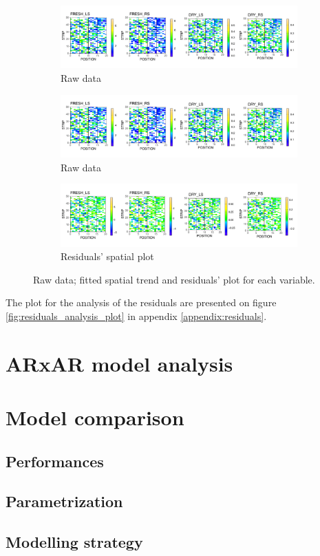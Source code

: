 \begin{figure}
	\begin{subfigure}[t]{\textwidth}
		\centering
		\includegraphics[width = \textwidth]{../../Figures/rawData_plot.pdf}
		\caption{Raw data}
	\end{subfigure}
	
	\begin{subfigure}[t]{\textwidth}
		\centering
		\includegraphics[width = \textwidth]{../../Figures/rawData_plot.pdf}
		\caption{Raw data}
	\end{subfigure}
	
	\begin{subfigure}[t]{\textwidth}
		\centering
		\includegraphics[width = \textwidth]{../../Figures/residuals_plot.pdf}
		\caption{Residuals' spatial plot}
	\end{subfigure}
	\caption{Raw data; fitted spatial trend and residuals' plot for each variable.}
	\label{fig:spats_model_results}
\end{figure}

The plot for the analysis of the residuals are presented on figure \ref{fig:residuals_analysis_plot} in appendix \ref{appendix:residuals}.

\section{ARxAR model analysis}
\section{Model comparison}
\subsection{Performances}
\subsection{Parametrization}
\subsection{Modelling strategy}

